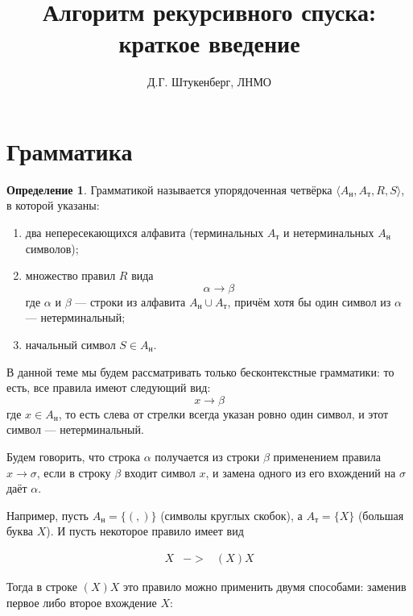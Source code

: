 \documentclass[12pt]{article}
\begin{document}
\theoremstyle{definition}
\newtheorem{definition}{Определение}[section]

\title{Алгоритм рекурсивного спуска: краткое введение}
\author{Д.Г. Штукенберг, ЛНМО}

\maketitle

\section{Грамматика}

\begin{definition} Грамматикой называется упорядоченная четвёрка 
$\langle A_\textrm{н}, A_\textrm{т}, R, S \rangle$, в которой указаны:
\begin{enumerate}
\item два непересекающихся алфавита (терминальных
$A_\textrm{т}$ и нетерминальных $A_\textrm{н}$ символов);
\item множество правил $R$ вида 
$$\alpha\rightarrow\beta$$ где $\alpha$ и $\beta$ --- строки из алфавита
$A_\textrm{н} \cup A_\textrm{т}$, причём хотя бы один символ из $\alpha$ --- 
нетерминальный;
\item начальный символ $S \in A_\textrm{н}$.
\end{enumerate}
\end{definition}

\noindent В данной теме мы будем рассматривать только бесконтекстные грамматики: то есть,
все правила имеют следующий вид: $$x \rightarrow \beta$$
где $x \in A_\textrm{н}$, то есть слева от стрелки всегда указан ровно один символ,
и этот символ --- нетерминальный.

Будем говорить, что строка $\alpha$ получается из строки $\beta$ применением
правила $x \rightarrow \sigma$, если в строку $\beta$ входит символ $x$,
и замена одного из его вхождений на $\sigma$ даёт $\alpha$.

Например, пусть $A_\textrm{н} = \{(, )\}$ (символы круглых скобок),
а $A_\textrm{т} = \{X\}$ (большая буква $X$).
И пусть некоторое правило имеет вид
\begin{bnf}\begin{eqnarray*}
X &->& (X)X
\end{eqnarray*}\end{bnf}
Тогда в строке $(X)X$ это правило можно применить двумя способами: заменив 
первое либо второе вхождение $X$:
\end{document}
